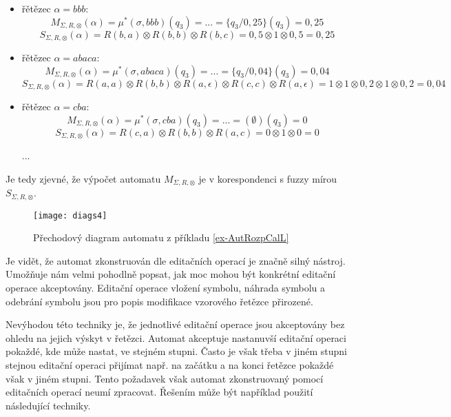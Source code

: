 \documentclass[a4paper,10pt]{article}
\begin{document}
\begin{example}
\begin{itemize}
  \item řětězec $\alpha = bbb$:
  $$
  M_{\Sigma, R, \otimes}(\alpha) 
   = \mu^*(\sigma, bbb) (q_3)
   = ...
   = \{ q_3 / 0,25 \} (q_3)
   = 0,25
  $$
  $$
  S_{\Sigma, R, \otimes}(\alpha) 
   = R(b, a) \otimes R(b, b) \otimes R(b, c) 
   = 0,5 \otimes 1 \otimes 0,5
   = 0,25
  $$
  
  \item řětězec $\alpha = abaca$:
  $$
  M_{\Sigma, R, \otimes}(\alpha) 
   = \mu^*(\sigma, abaca) (q_3)
   = ...
   = \{ q_3 / 0,04 \} (q_3)
   = 0,04
  $$
  $$
  S_{\Sigma, R, \otimes}(\alpha) 
   = R(a, a) \otimes R(b, b) \otimes R(a, \epsilon) \otimes R(c, c) \otimes R(a, \epsilon)
   = 1 \otimes 1 \otimes 0,2 \otimes 1 \otimes 0,2
   = 0,04
  $$

  \item řětězec $\alpha = cba$:
  $$
  M_{\Sigma, R, \otimes}(\alpha) 
   = \mu^*(\sigma, cba) (q_3)
   = ...
   = (\emptyset) (q_3)
   = 0
  $$
  $$
  S_{\Sigma, R, \otimes}(\alpha) 
   = R(c, a) \otimes R(b, b) \otimes R(a, c) 
   = 0 \otimes 1 \otimes 0
   = 0
  $$
  
  ...
  
 \end{itemize}

 Je tedy zjevné, že výpočet automatu $M_{\Sigma, R, \otimes}$ je v korespondenci s fuzzy mírou $S_{\Sigma, R, \otimes}$.
 
 \begin{figure}
  \texttt{[image: diags4]}
  \caption{Přechodový diagram automatu z příkladu \ref{ex-AutRozpCalL}} \label{img-AutRozpCalL}
 \end{figure}
\end{example}

Je vidět, že automat zkonstruován dle editačních operací je značně silný nástroj. Umožňuje nám velmi pohodlně popsat, jak moc mohou být konkrétní editační operace akceptovány. Editační operace vložení symbolu, náhrada symbolu a odebrání symbolu jsou pro popis modifikace vzorového řetězce přirozené.

Nevýhodou této techniky je, že jednotlivé editační operace jsou akceptovány bez ohledu na jejich výskyt v řetězci. Automat akceptuje nastanuvší editační operaci pokaždé, kde může nastat, ve stejném stupni. Často je však třeba v jiném stupni stejnou editační operaci přijímat např. na začátku a na konci řetězce pokaždé však v jiném stupni. Tento požadavek však automat zkonstruovaný pomocí editačních operací neumí zpracovat. Řešením může být například použití následující techniky.
\end{document}
